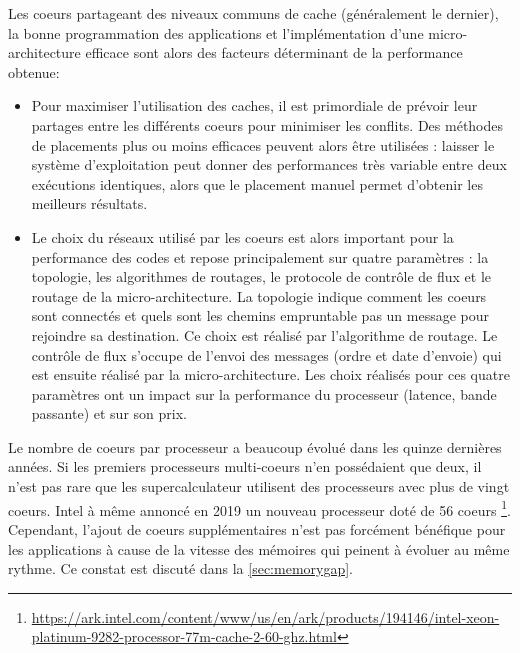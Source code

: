 Les coeurs partageant des niveaux communs de cache (généralement le dernier), la bonne programmation des applications et l'implémentation d'une micro-architecture efficace sont alors des facteurs déterminant de la performance obtenue:
\begin{itemize}
    \item Pour maximiser l'utilisation des caches, il est primordiale de prévoir leur partages entre les différents coeurs pour minimiser les conflits. Des méthodes de placements plus ou moins efficaces peuvent alors être utilisées \cite{mazouz2011performance}: laisser le système d'exploitation peut donner des performances très variable entre deux exécutions identiques, alors que le placement manuel permet d'obtenir les meilleurs résultats. 
    \item Le choix du réseaux utilisé par les coeurs est alors important pour la performance des codes et repose principalement sur quatre paramètres \cite{peh2009chip} : la topologie, les algorithmes de routages, le protocole de contrôle de flux et le routage de la micro-architecture. La topologie indique comment les coeurs sont connectés et quels sont les chemins empruntable pas un message pour rejoindre sa destination. Ce choix est réalisé par l’algorithme de routage. Le contrôle de flux s’occupe de l'envoi des messages (ordre et date d’envoie) qui est ensuite réalisé par la micro-architecture. Les choix réalisés pour ces quatre paramètres ont un impact sur la performance du processeur (latence, bande passante) et sur son prix. 

\end{itemize}


Le nombre de coeurs par processeur a beaucoup évolué dans les quinze dernières années. Si les premiers processeurs multi-coeurs n'en possédaient que deux, il n'est pas rare que les supercalculateur utilisent des processeurs avec plus de vingt coeurs. Intel à même annoncé en 2019 un nouveau processeur doté de 56 coeurs \footnote{\url{https://ark.intel.com/content/www/us/en/ark/products/194146/intel-xeon-platinum-9282-processor-77m-cache-2-60-ghz.html}}. Cependant, l'ajout de coeurs supplémentaires n'est pas forcément bénéfique pour les applications à cause de la vitesse des mémoires qui peinent à évoluer au même rythme. Ce constat est discuté dans la \autoref{sec:memorygap}.



























